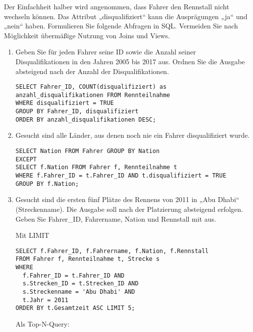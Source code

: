 \documentclass{bschlangaul-aufgabe}
\begin{document}
\noindent
Der Einfachheit halber wird angenommen, dass Fahrer den Rennstall nicht
wechseln können. Das Attribut „disqualifiziert“ kann die Ausprägungen
„ja“ und „nein“ haben. Formulieren Sie folgende Abfragen in SQL.
Vermeiden Sie nach Möglichkeit übermäßige Nutzung von Joins und Views.

\begin{enumerate}
\item Geben Sie für jeden Fahrer seine ID sowie die Anzahl seiner
Disqualifikationen in den Jahren 2005 bis 2017 aus. Ordnen Sie die
Ausgabe absteigend nach der Anzahl der Disqualifikationen.

\begin{liAntwort}
\begin{verbatim}
SELECT Fahrer_ID, COUNT(disqualifiziert) as anzahl_disqualifikationen FROM Rennteilnahme
WHERE disqualifiziert = TRUE
GROUP BY Fahrer_ID, disqualifiziert
ORDER BY anzahl_disqualifikationen DESC;
\end{verbatim}
\end{liAntwort}

\item Gesucht sind alle Länder, aus denen noch nie ein Fahrer
disqualifiziert wurde.

\begin{liAntwort}
\begin{verbatim}
SELECT Nation FROM Fahrer GROUP BY Nation
EXCEPT
SELECT f.Nation FROM Fahrer f, Rennteilnahme t
WHERE f.Fahrer_ID = t.Fahrer_ID AND t.disqualifiziert = TRUE
GROUP BY f.Nation;
\end{verbatim}
\end{liAntwort}

\item Gesucht sind die ersten fünf Plätze des Rennens von 2011 in „Abu
Dhabi“ (Streckenname). Die Ausgabe soll nach der Platzierung absteigend
erfolgen. Geben Sie Fahrer\_ID, Fahrername, Nation und Rennstall mit
aus.

\begin{liAntwort}
Mit LIMIT
\begin{verbatim}
SELECT f.Fahrer_ID, f.Fahrername, f.Nation, f.Rennstall
FROM Fahrer f, Rennteilnahme t, Strecke s
WHERE
  f.Fahrer_ID = t.Fahrer_ID AND
  s.Strecken_ID = t.Strecken_ID AND
  s.Streckenname = 'Abu Dhabi' AND
  t.Jahr = 2011
ORDER BY t.Gesamtzeit ASC LIMIT 5;
\end{verbatim}

Als Top-N-Query:


\end{liAntwort}
\end{enumerate}
\end{document}
